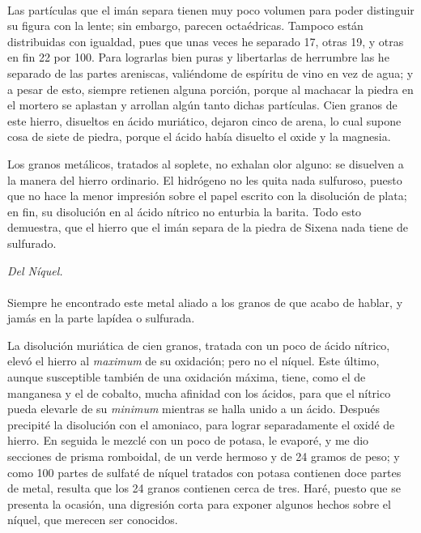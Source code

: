 \documentclass[a4paper, 11pt, oneside, polutonikogreek, spanish]{article}
\begin{document}
\paragraph{}
Las partículas que el imán separa tienen muy poco volumen para poder distinguir su figura con la lente; sin embargo, parecen octaédricas. Tampoco están distribuidas con igualdad, pues que unas veces he separado 17, otras 19, y otras en fin 22 por 100. Para lograrlas bien puras y libertarlas de herrumbre las he separado de las partes areniscas, valiéndome de espíritu de vino en vez de agua; y a pesar de esto, siempre retienen alguna porción, porque al machacar la piedra en el mortero se aplastan y arrollan algún tanto dichas partículas. Cien granos de este hierro, disueltos en ácido muriático, dejaron cinco de arena, lo cual supone cosa de siete de piedra, porque el ácido había disuelto el oxide y la magnesia.

Los granos metálicos, tratados al soplete, no exhalan olor alguno: se disuelven a la manera del hierro ordinario. El hidrógeno no les quita nada sulfuroso, puesto que no hace la menor impresión sobre el papel escrito con la disolución de plata; en fin, su disolución en al ácido nítrico no enturbia la barita. Todo esto demuestra, que el hierro que el imán separa de la piedra de Sixena nada tiene de sulfurado.
\begin{center}
\emph{Del Níquel.}
\end{center}
\paragraph{}
Siempre he encontrado este metal aliado a los granos de que acabo de hablar, y jamás en la parte lapídea o sulfurada.

La disolución muriática de cien granos, tratada con un poco de ácido nítrico, elevó el hierro al \emph{maximum} de su oxidación; pero no el níquel. Este último, aunque susceptible también de una oxidación máxima, tiene, como el de manganesa y el de cobalto, mucha afinidad con los ácidos, para que el nítrico pueda elevarle de su \emph{minimum} mientras se halla unido a un ácido. Después precipité la disolución con el amoniaco, para lograr separadamente el oxidé de hierro. En seguida le mezclé con un poco de potasa, le evaporé, y me dio secciones de prisma romboidal, de un verde hermoso y de 24 gramos de peso; y como 100 partes de sulfaté de níquel tratados con potasa contienen doce partes de metal, resulta que los 24 granos contienen cerca de tres. Haré, puesto que se presenta la ocasión, una digresión corta para exponer algunos hechos sobre el níquel, que merecen ser conocidos.
\end{document}
